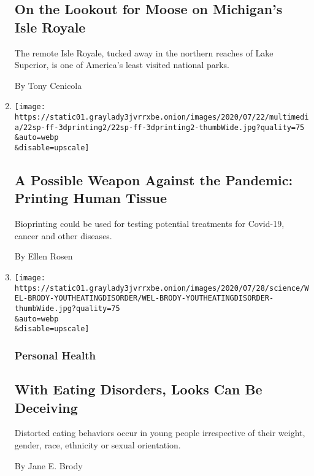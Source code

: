 \begin{enumerate}
  \hypertarget{on-the-lookout-for-moose-on-michigans-isle-royale}{%
  \subsection{On the Lookout for Moose on Michigan's Isle
  Royale}\label{on-the-lookout-for-moose-on-michigans-isle-royale}}

  The remote Isle Royale, tucked away in the northern reaches of Lake
  Superior, is one of America's least visited national parks.

  By Tony Cenicola
\item
  \href{/2020/07/27/science/bioprinting-covid-19-tests.html}{}

  \texttt{[image: https://static01.graylady3jvrrxbe.onion/images/2020/07/22/multimedia/22sp-ff-3dprinting2/22sp-ff-3dprinting2-thumbWide.jpg?quality=75\\\&auto=webp\\\&disable=upscale]}

  \hypertarget{a-possible-weapon-against-the-pandemic-printing-human-tissue}{%
  \subsection{A Possible Weapon Against the Pandemic: Printing Human
  Tissue}\label{a-possible-weapon-against-the-pandemic-printing-human-tissue}}

  Bioprinting could be used for testing potential treatments for
  Covid-19, cancer and other diseases.

  By Ellen Rosen
\item
  \href{/2020/07/27/well/eat/eating-disorders.html}{}

  \texttt{[image: https://static01.graylady3jvrrxbe.onion/images/2020/07/28/science/WEL-BRODY-YOUTHEATINGDISORDER/WEL-BRODY-YOUTHEATINGDISORDER-thumbWide.jpg?quality=75\\\&auto=webp\\\&disable=upscale]}

  \hypertarget{personal-health}{%
  \subsubsection{Personal Health}\label{personal-health}}

  \hypertarget{with-eating-disorders-looks-can-be-deceiving-1}{%
  \subsection{With Eating Disorders, Looks Can Be
  Deceiving}\label{with-eating-disorders-looks-can-be-deceiving-1}}

  Distorted eating behaviors occur in young people irrespective of their
  weight, gender, race, ethnicity or sexual orientation.

  By Jane E. Brody
\end{enumerate}


